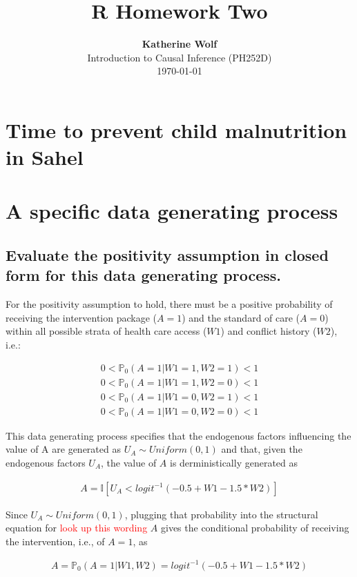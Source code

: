 \documentclass{article}\usepackage[]{graphicx}\usepackage[]{xcolor}
\title{\textbf{R Homework Two}}
\author{\textbf{Katherine Wolf}\\ Introduction to Causal Inference (PH252D)\\ \today}
\date{}
\begin{document}
\maketitle

\section{Time to prevent child malnutrition in Sahel}

\section{A specific data generating process}

  \subsection{Evaluate the positivity assumption in closed form for this data generating process.}
  
For the positivity assumption to hold, there must be a positive probability of receiving the intervention package ($A = 1$) and the standard of care ($A = 0$) within all possible strata of health care access ($W1$) and conflict history ($W2$), i.e.:

\begin{align*}
0<\mathbb{P}_0(A=1|W1=1,W2=1)<1 \\
0<\mathbb{P}_0(A=1|W1=1,W2=0)<1 \\
0<\mathbb{P}_0(A=1|W1=0,W2=1)<1 \\
0<\mathbb{P}_0(A=1|W1=0,W2=0)<1
\end{align*}

This data generating process specifies that the endogenous factors influencing the value of A are generated as $U_A \sim Uniform(0,1)$ and that, given the endogenous factors $U_A$, the value of $A$ is derministically generated as 
  
\begin{align*}
A=\mathbb{I}[U_A<logit^{-1}(-0.5+W1-1.5*W2)]
\end{align*}

Since $U_A \sim Uniform(0,1)$, plugging that probability into the structural equation for \textcolor{red}{look up this wording} $A$ gives the conditional probability of receiving the intervention, i.e., of $A=1$, as

\begin{align*}
A=\mathbb{P}_0(A=1|W1,W2)=logit^{-1}(-0.5+W1-1.5*W2)
\end{align*}
\end{document}

